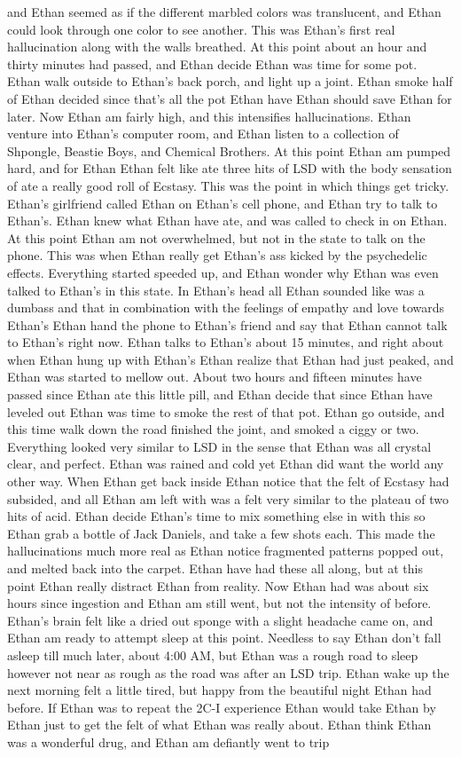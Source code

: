 \documentclass[12pt]{book}
\begin{document}
and Ethan seemed as if the different marbled colors was translucent, and Ethan could look through one color to see another. This was Ethan's first real hallucination along with the walls breathed. At this point about an hour and thirty minutes had passed, and Ethan decide Ethan was time for some pot. Ethan walk outside to Ethan's back porch, and light up a joint. Ethan smoke half of Ethan decided since that's all the pot Ethan have Ethan should save Ethan for later. Now Ethan am fairly high, and this intensifies hallucinations. Ethan venture into Ethan's computer room, and Ethan listen to a collection of Shpongle, Beastie Boys, and Chemical Brothers. At this point Ethan am pumped hard, and for Ethan Ethan felt like ate three hits of LSD with the body sensation of ate a really good roll of Ecstasy. This was the point in which things get tricky. Ethan's girlfriend called Ethan on Ethan's cell phone, and Ethan try to talk to Ethan's. Ethan knew what Ethan have ate, and was called to check in on Ethan. At this point Ethan am not overwhelmed, but not in the state to talk on the phone. This was when Ethan really get Ethan's ass kicked by the psychedelic effects. Everything started speeded up, and Ethan wonder why Ethan was even talked to Ethan's in this state. In Ethan's head all Ethan sounded like was a dumbass and that in combination with the feelings of empathy and love towards Ethan's Ethan hand the phone to Ethan's friend and say that Ethan cannot talk to Ethan's right now. Ethan talks to Ethan's about 15 minutes, and right about when Ethan hung up with Ethan's Ethan realize that Ethan had just peaked, and Ethan was started to mellow out. About two hours and fifteen minutes have passed since Ethan ate this little pill, and Ethan decide that since Ethan have leveled out Ethan was time to smoke the rest of that pot. Ethan go outside, and this time walk down the road finished the joint, and smoked a ciggy or two. Everything looked very similar to LSD in the sense that Ethan was all crystal clear, and perfect. Ethan was rained and cold yet Ethan did want the world any other way. When Ethan get back inside Ethan notice that the felt of Ecstasy had subsided, and all Ethan am left with was a felt very similar to the plateau of two hits of acid. Ethan decide Ethan's time to mix something else in with this so Ethan grab a bottle of Jack Daniels, and take a few shots each. This made the hallucinations much more real as Ethan notice fragmented patterns popped out, and melted back into the carpet. Ethan have had these all along, but at this point Ethan really distract Ethan from reality. Now Ethan had was about six hours since ingestion and Ethan am still went, but not the intensity of before. Ethan's brain felt like a dried out sponge with a slight headache came on, and Ethan am ready to attempt sleep at this point. Needless to say Ethan don't fall asleep till much later, about 4:00 AM, but Ethan was a rough road to sleep however not near as rough as the road was after an LSD trip. Ethan wake up the next morning felt a little tired, but happy from the beautiful night Ethan had before. If Ethan was to repeat the 2C-I experience Ethan would take Ethan by Ethan just to get the felt of what Ethan was really about. Ethan think Ethan was a wonderful drug, and Ethan am defiantly went to trip 
\end{document}
